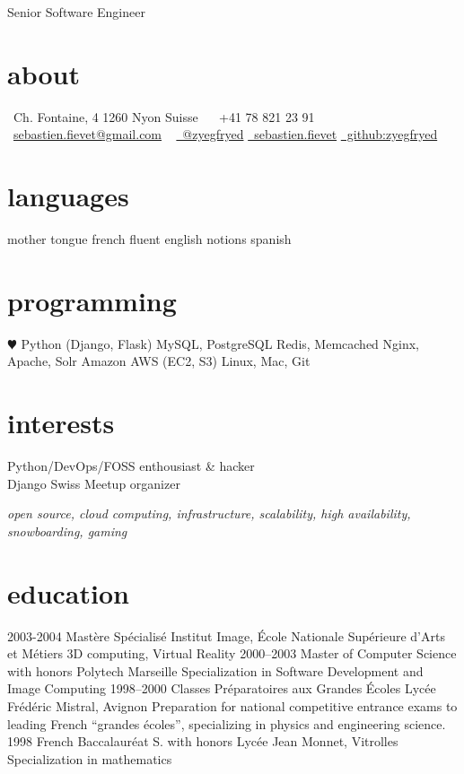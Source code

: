 \documentclass[]{friggeri-cv}
\def\home{{\FA \faHome}}
\def\phone{{\FA \faPhone}}
\def\inbox{{\FA \faEnvelope}}
\def\linkedin{{\FA \faLinkedin}}
\def\twitter{{\FA \faTwitter}}
\def\github{{\FA \faGithub}}
\begin{document}
       {Senior Software Engineer}


\begin{aside}
  \section{about}
    \home\ Ch. Fontaine, 4
    1260 Nyon
    Suisse
    ~
    \phone\ +41 78 821 23 91
    \inbox\ \href{mailto:sebastien.fievet@gmail.com}{sebastien.fievet@gmail.com}
    ~
    \href{https://twitter.com/zyegfryed}{\twitter\ @zyegfryed}
    \href{http://www.linkedin.com/in/sebastienfievet}{\linkedin\ sebastien.fievet}
    \href{https://github.com/zyegfryed}{\github\ github:zyegfryed}
  \section{languages}
    mother tongue french
    fluent english
    notions spanish
  \section{programming}
    {\color{red} $\varheartsuit$} Python
    (Django, Flask)
    MySQL, PostgreSQL
    Redis, Memcached
    Nginx, Apache, Solr
    Amazon AWS (EC2, S3)
    Linux, Mac, Git
\end{aside}

\section{interests}

Python/DevOps/FOSS enthousiast \& hacker\\
Django Swiss Meetup organizer

\emph{open source, cloud computing, infrastructure, scalability, high availability, snowboarding, gaming}

\section{education}

\begin{entrylist}
  \entry
    {2003-2004}
    {Mastère Spécialisé}
    {Institut Image, École Nationale Supérieure d'Arts et Métiers}
    {3D computing, Virtual Reality}
  \entry
    {2000–2003}
    {Master of Computer Science with honors}
    {Polytech Marseille}
    {Specialization in Software Development and Image Computing}
  \entry
    {1998–2000}
    {Classes Préparatoires aux Grandes Écoles}
    {Lycée Frédéric Mistral, Avignon}
    {Preparation for national competitive entrance exams to leading French ``grandes écoles'', specializing in physics and engineering science.}
  \entry
    {1998}
    {French Baccalauréat S. with honors}
    {Lycée Jean Monnet, Vitrolles}
    {Specialization in mathematics}
\end{entrylist}
\end{document}
